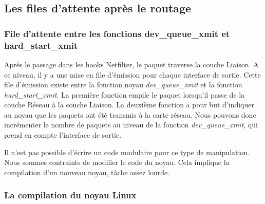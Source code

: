 \documentclass[a4paper]{article}
\begin{document}
\subsection{Les files d'attente après le routage}

\subsubsection{File d'attente entre les fonctions dev\_queue\_xmit et hard\_start\_xmit}

Après le passage dans les hooks Netfilter, le paquet traverse la couche Liaison. A ce niveau, il y a une mise en file d’émission pour chaque interface de sortie. Cette file d’émission existe entre la fonction noyau \textit{dev\_queue\_xmit} et la fonction \textit{hard\_start\_xmit}. La première fonction empile le paquet lorsqu’il passe de la couche Réseau à la couche Liaison. La deuxième fonction a pour but d’indiquer au noyau que les paquets ont été transmis à la carte réseau. Nous pouvons donc incrémenter le nombre de paquets au niveau de la fonction \textit{dev\_queue\_xmit}, qui prend en compte l’interface de sortie.

Il n’est pas possible d’écrire un code modulaire pour ce type de manipulation. Nous sommes contraints de modifier le code du noyau. Cela implique la compilation d’un nouveau noyau, tâche assez lourde. 

\subsubsection{La compilation du noyau Linux}
\end{document}
